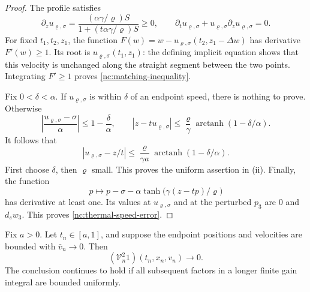 \begin{proof}
The profile satisfies
\[
 \partial_z u_{\varrho,\sigma}
 =\frac{(\alpha\gamma/\varrho)S}
        {1+(t\alpha\gamma/\varrho)S}\ge0,
 \qquad
 \partial_tu_{\varrho,\sigma}
       +u_{\varrho,\sigma}\partial_zu_{\varrho,\sigma}=0.
\]
For fixed \(t_1,t_2,z_1\), the function
\(F(w)=w-u_{\varrho,\sigma}(t_2,z_1-\Delta w)\) has derivative
\(F'(w)\ge1\).  Its root is
\(u_{\varrho,\sigma}(t_1,z_1)\): the defining implicit equation shows
that this velocity is unchanged along the straight segment between
the two points.  Integrating \(F'\ge1\) proves
\eqref{nc:matching-inequality}.

Fix \(0<\delta<\alpha\).  If \(u_{\varrho,\sigma}\) is within
\(\delta\) of an endpoint speed, there is nothing to prove.
Otherwise
\[
 \left|\frac{u_{\varrho,\sigma}-\sigma}{\alpha}\right|
 \le1-\frac{\delta}{\alpha},
 \qquad
 |z-tu_{\varrho,\sigma}|
 \le\frac{\varrho}{\gamma}
       \operatorname{arctanh}(1-\delta/\alpha).
\]
It follows that
\[
 |u_{\varrho,\sigma}-z/t|
 \le\frac{\varrho}{\gamma a}
       \operatorname{arctanh}(1-\delta/\alpha).
\]
First choose \(\delta\), then \(\varrho\) small.  This proves the
uniform assertion in (ii).
Finally, the function
\[
 p\longmapsto p-\sigma-\alpha\tanh\bigl(\gamma(z-tp)/\varrho\bigr)
\]
has derivative at least one.  Its values at \(u_{\varrho,\sigma}\)
and at the perturbed \(p_3\) are \(0\) and \(d_sw_3\).
This proves \eqref{nc:thermal-speed-error}.
\end{proof}

\begin{lemma}
\label{nc:two-axial-gains}
Fix \(a>0\).  Let \(t_n\in[a,1]\), and suppose the endpoint
positions and velocities are bounded with \(\bar v_n\to0\).
Then
\[
 (\mathcal V_n^2 1)(t_n,x_n,v_n)\longrightarrow0.
\]
The conclusion continues to hold if all subsequent factors in a
longer finite gain integral are bounded uniformly.
\end{lemma}

